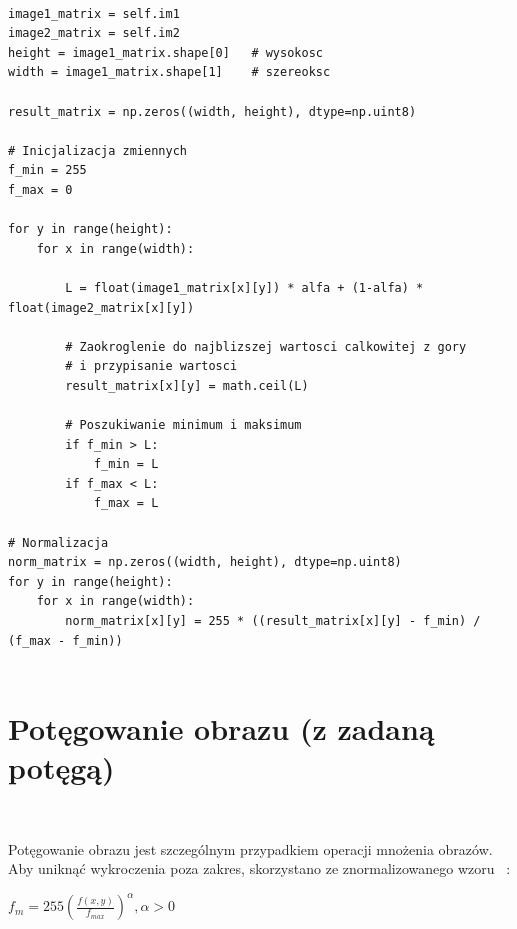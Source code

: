 \documentclass[final,a4paper,openany,12pt]{mwbk}
\begin{document}
\begin{lstlisting}[caption=Mieszanie obrazów szarych z określonym współczynnikiem]

image1_matrix = self.im1
image2_matrix = self.im2
height = image1_matrix.shape[0]   # wysokosc
width = image1_matrix.shape[1]    # szereoksc

result_matrix = np.zeros((width, height), dtype=np.uint8)

# Inicjalizacja zmiennych
f_min = 255
f_max = 0

for y in range(height):
    for x in range(width):  

        L = float(image1_matrix[x][y]) * alfa + (1-alfa) * float(image2_matrix[x][y])

        # Zaokroglenie do najblizszej wartosci calkowitej z gory
        # i przypisanie wartosci
        result_matrix[x][y] = math.ceil(L)

        # Poszukiwanie minimum i maksimum
        if f_min > L:
            f_min = L
        if f_max < L:
            f_max = L

# Normalizacja
norm_matrix = np.zeros((width, height), dtype=np.uint8)
for y in range(height):
    for x in range(width):
        norm_matrix[x][y] = 255 * ((result_matrix[x][y] - f_min) / (f_max - f_min))
        
\end{lstlisting}



\section {Potęgowanie obrazu (z zadaną potęgą)}
\hfill\\
\indent

		\begin{center} Potęgowanie obrazu jest szczególnym przypadkiem operacji mnożenia obrazów. Aby uniknąć wykroczenia poza zakres, skorzystano ze znormalizowanego wzoru ~\cite{WykRat}:

		$f_{m} = 255(\frac{f(x,y)}{f_{max}}) ^{\alpha}, \alpha > 0 $
	\end{center}
	
\end{document}
